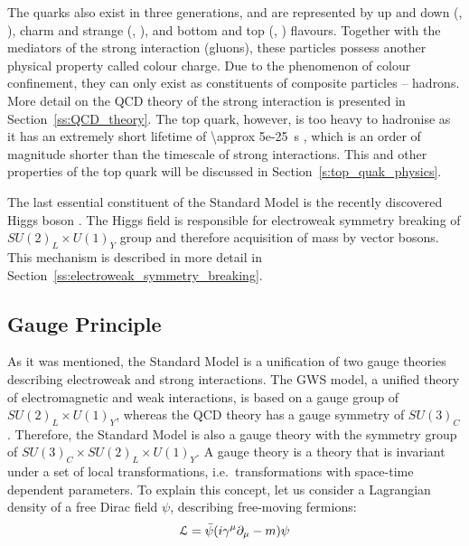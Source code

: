 The quarks also exist in three generations, and are represented by up and down (\cPqu, \cPqd), charm and strange (\cPqc,
\cPqs), and bottom and top (\cPqb, \cPqt) flavours. Together with the mediators of the strong interaction (gluons),
these particles possess another physical property called colour charge. Due to the phenomenon of colour confinement,
they can only exist as constituents of composite particles -- hadrons. More detail on the QCD theory of the strong
interaction is presented in Section~\ref{ss:QCD_theory}. The top quark, however, is too heavy to hadronise as it has an
extremely short lifetime of \SI{\approx 5e-25}{\s} \autocite{PDG}, which is an order of magnitude shorter than the
timescale of strong interactions. This and other properties of the top quark will be discussed in
Section~\ref{s:top_quak_physics}.

The last essential constituent of the Standard Model is the recently discovered Higgs boson
\autocite{ATLAS_higgs_observation, CMS_higgs_observation}. The Higgs field is responsible for electroweak symmetry
breaking of $SU(2)_L \times U(1)_Y$ group and therefore acquisition of mass by vector bosons. This mechanism is
described in more detail in Section~\ref{ss:electroweak_symmetry_breaking}.



\newpage
\subsection{Gauge Principle}
\label{ss:gauge_principle}
As it was mentioned, the Standard Model is a unification of two gauge theories describing electroweak and strong
interactions. The GWS model, a unified theory of electromagnetic and weak interactions, is based on a gauge group of
$SU(2)_L \times U(1)_Y$, whereas the QCD theory has a gauge symmetry of $SU(3)_C$. Therefore, the Standard Model is also
a gauge theory with the symmetry group of $SU(3)_C \times SU(2)_L \times U(1)_Y$. A gauge theory is a theory that is
invariant under a set of local transformations, i.e.\ transformations with space-time dependent parameters. To explain
this concept, let us consider a Lagrangian density of a free Dirac field $\psi$, describing free-moving fermions:
\begin{equation}
\mathcal{L} = \bar{\psi}(i \gamma^\mu	\partial_\mu - m) \psi
\label{eq:dirac_field_L}
\end{equation}

